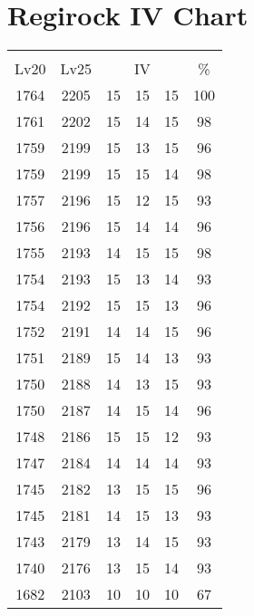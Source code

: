 \documentclass{article}%
\begin{document}
%
\normalsize%
\section{Regirock IV Chart}%
\label{sec:Regirock IV Chart}%
\renewcommand{\arraystretch}{1.5}%
\begin{tabular}{|c|c|c|c|c|c|}%
\hline%
\multicolumn{6}{|c|}{\textcolor{white}{ 
\linebreak{Regirock}
}%
\cellcolor{black}}\\%
\multicolumn{1}{|c}{Lv20}&\multicolumn{1}{c|}{Lv25}&\multicolumn{3}{c|}{IV}&\multicolumn{1}{|c|}{\%}\\%
\hline%
\rowcolor{color100}%
1764&2205&15&15&15&100\\%
\hline%
\rowcolor{color98}%
1761&2202&15&14&15&98\\%
\hline%
\rowcolor{color96}%
1759&2199&15&13&15&96\\%
\hline%
\rowcolor{color98}%
1759&2199&15&15&14&98\\%
\hline%
\rowcolor{color93}%
1757&2196&15&12&15&93\\%
\hline%
\rowcolor{color96}%
1756&2196&15&14&14&96\\%
\hline%
\rowcolor{color98}%
1755&2193&14&15&15&98\\%
\hline%
\rowcolor{color93}%
1754&2193&15&13&14&93\\%
\hline%
\rowcolor{color96}%
1754&2192&15&15&13&96\\%
\hline%
\rowcolor{color96}%
1752&2191&14&14&15&96\\%
\hline%
\rowcolor{color93}%
1751&2189&15&14&13&93\\%
\hline%
\rowcolor{color93}%
1750&2188&14&13&15&93\\%
\hline%
\rowcolor{color96}%
1750&2187&14&15&14&96\\%
\hline%
\rowcolor{color93}%
1748&2186&15&15&12&93\\%
\hline%
\rowcolor{color93}%
1747&2184&14&14&14&93\\%
\hline%
\rowcolor{color96}%
1745&2182&13&15&15&96\\%
\hline%
\rowcolor{color93}%
1745&2181&14&15&13&93\\%
\hline%
\rowcolor{color93}%
1743&2179&13&14&15&93\\%
\hline%
\rowcolor{color93}%
1740&2176&13&15&14&93\\%
\hline%
\rowcolor{color91}%
1682&2103&10&10&10&67\\%
\end{tabular}

%
\end{document}

